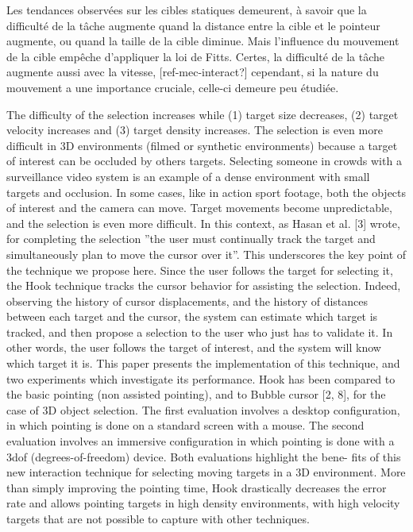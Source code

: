 	Les tendances observées sur les cibles statiques demeurent, à savoir que la difficulté de la tâche augmente quand la distance entre la cible et le pointeur augmente, ou quand la taille de la cible diminue. Mais l'influence du mouvement de la cible empêche d'appliquer la loi de Fitts. Certes, la difficulté de la tâche augmente aussi avec la vitesse, [ref-mec-interact?] cependant, si la nature du mouvement a une importance cruciale, celle-ci demeure peu étudiée.
    
    
    
    
 The
difficulty of the selection increases while (1) target size decreases,
(2) target velocity increases and (3) target density increases. The
selection is even more difficult in 3D environments (filmed or synthetic
environments) because a target of interest can be occluded
by others targets. Selecting someone in crowds with a surveillance
video system is an example of a dense environment with small targets
and occlusion. In some cases, like in action sport footage, both
the objects of interest and the camera can move. Target movements
become unpredictable, and the selection is even more difficult.
In this context, as Hasan et al. [3] wrote, for completing the
selection ”the user must continually track the target and simultaneously
plan to move the cursor over it”. This underscores the key
point of the technique we propose here. Since the user follows the
target for selecting it, the Hook technique tracks the cursor behavior
for assisting the selection. Indeed, observing the history of cursor
displacements, and the history of distances between each target and
the cursor, the system can estimate which target is tracked, and then
propose a selection to the user who just has to validate it. In other
words, the user follows the target of interest, and the system will
know which target it is.
This paper presents the implementation of this technique, and
two experiments which investigate its performance. Hook has been
compared to the basic pointing (non assisted pointing), and to Bubble
cursor [2, 8], for the case of 3D object selection. The first evaluation
involves a desktop configuration, in which pointing is done
on a standard screen with a mouse. The second evaluation involves
an immersive configuration in which pointing is done with a 3dof
(degrees-of-freedom) device. Both evaluations highlight the bene-
fits of this new interaction technique for selecting moving targets in
a 3D environment. More than simply improving the pointing time,
Hook drastically decreases the error rate and allows pointing targets
in high density environments, with high velocity targets that are not
possible to capture with other techniques.


	
		

\clearpage
